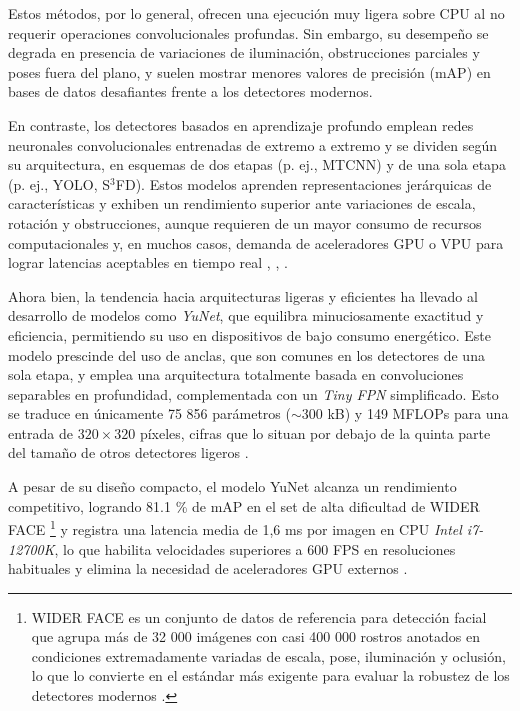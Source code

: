 Estos métodos, por lo general, ofrecen una ejecución muy ligera sobre CPU al no requerir operaciones convolucionales profundas. Sin embargo, su desempeño se degrada en presencia de variaciones de iluminación, obstrucciones parciales y poses fuera del plano, y suelen mostrar menores valores de precisión (mAP) en bases de datos desafiantes frente a los detectores modernos.

En contraste, los detectores basados en aprendizaje profundo emplean redes neuronales convolucionales entrenadas de extremo a extremo y se dividen según su arquitectura, en esquemas de dos etapas (p. ej., MTCNN) y de una sola etapa (p. ej., YOLO, S$^3$FD). Estos modelos aprenden representaciones jerárquicas de características y exhiben un rendimiento superior ante variaciones de escala, rotación y obstrucciones, aunque requieren de un mayor consumo de recursos computacionales y, en muchos casos, demanda de aceleradores GPU o VPU para lograr latencias aceptables en tiempo real \cite{zhang_mtcnn_2016}, \cite{bazarevsky_blazeface_2019}, \cite{redmon_yolo_2016}.

Ahora bien, la tendencia hacia arquitecturas ligeras y eficientes ha llevado al desarrollo de modelos como \textit{YuNet}, que equilibra minuciosamente exactitud y eficiencia, permitiendo su uso en dispositivos de bajo consumo energético. Este modelo prescinde del uso de anclas, que son comunes en los detectores de una sola etapa, y emplea una arquitectura totalmente basada en convoluciones separables en profundidad, complementada con un \textit{Tiny FPN} simplificado. Esto se traduce en únicamente 75 856 parámetros ($\sim$300 kB) y 149 MFLOPs para una entrada de $320 \times 320$ píxeles, cifras que lo situan por debajo de la quinta parte del tamaño de otros detectores ligeros \cite{wu_yunet_2023}.

A pesar de su diseño compacto, el modelo YuNet alcanza un rendimiento competitivo, logrando 81.1 \% de mAP en el set de alta dificultad de WIDER FACE \footnote{WIDER FACE es un conjunto de datos de referencia para detección facial que agrupa más de 32 000 imágenes con casi 400 000 rostros anotados en condiciones extremadamente variadas de escala, pose, iluminación y oclusión, lo que lo convierte en el estándar más exigente para evaluar la robustez de los detectores modernos \cite{yang_widerface_2016}.} y registra una latencia media de 1,6 ms por imagen en CPU \textit{Intel i7-12700K}, lo que habilita velocidades superiores a 600 FPS en resoluciones habituales y elimina la necesidad de aceleradores GPU externos \cite{wu_yunet_2023}.

